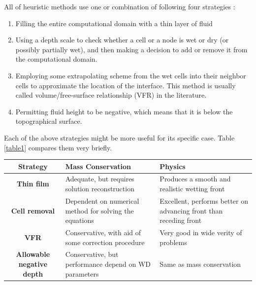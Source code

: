 \documentclass[letterpaper,10pt]{article}
\begin{document}
All of heuristic methods use one or combination of following four strategies \cite{Medeiros2013}: 
\begin{enumerate}
 
 \item Filling the entire computational domain with a thin layer of fluid
 \item Using a depth scale to check whether a cell or a node is wet or dry 
 (or possibly partially wet), and then  making a decision to add or remove it 
 from the computational domain.
 \item Employing some extrapolating scheme from the wet cells into their neighbor 
 cells to approximate the location of the interface. This method is usually called 
 volume/free-surface relationship (VFR) in the literature.
 \item Permitting fluid height to be negative, which means that it is below the topographical surface.
\end{enumerate}
Each of the above strategies might be more useful for its specific case. Table \ref{table1} compares them very briefly.

\begin{center}\label{table1}
\begin{tabular}{|c|p{5cm}|p{5cm}|}
 
\hline
{\bf Strategy}                  & {\bf Mass Conservation}                                          & {\bf Physics} \\
\hline
{\bf Thin film}                 & Adequate, but requires solution reconstruction 
& Produces a smooth and realistic wetting front     \\
\hline 
{\bf Cell removal}              & Dependent on numerical method for solving the equations          & Excellent, performs better on advancing front than receding front \\
\hline
{\bf VFR}                       & Conservative, with aid of some correction procedure              & Very good in wide verity of problems      \\
\hline
{\bf Allowable negative depth}  & Conservative, but performance depend on WD parameters            & Same as mass conservation      \\
\hline
\end{tabular}
\end{center}
\end{document}

